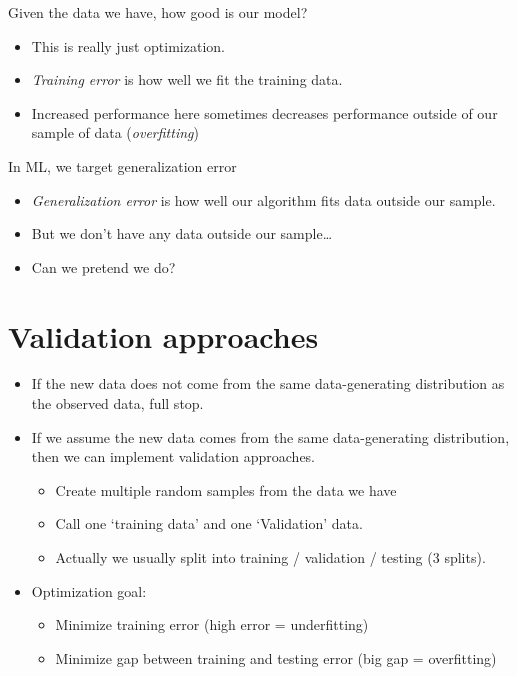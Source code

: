 \documentclass[fontset=fandol,zihao=false,scheme=chinese,heading=true,UTF8]{ctexbook}
\providecommand{\tightlist}{%
  \setlength{\itemsep}{0pt}\setlength{\parskip}{0pt}}
\begin{document}
Given the data we have, how good is our model?

\begin{itemize}
\tightlist
\item
  This is really just optimization.
\item
  \emph{Training error} is how well we fit the training data.
\item
  Increased performance here sometimes decreases performance outside of our sample of data (\emph{overfitting})
\end{itemize}

In ML, we target generalization error

\begin{itemize}
\tightlist
\item
  \emph{Generalization error} is how well our algorithm fits data outside our sample.
\item
  But we don't have any data outside our sample\ldots{}
\item
  Can we pretend we do?
\end{itemize}

\hypertarget{validation-approaches}{%
\section{Validation approaches}\label{validation-approaches}}

\begin{itemize}
\tightlist
\item
  If the new data does not come from the same data-generating distribution as the observed data, full stop.
\item
  If we assume the new data comes from the same data-generating distribution, then we can implement validation approaches.

  \begin{itemize}
  \tightlist
  \item
    Create multiple random samples from the data we have
  \item
    Call one `training data' and one `Validation' data.
  \item
    Actually we usually split into training / validation / testing (3 splits).
  \end{itemize}
\item
  Optimization goal:

  \begin{itemize}
  \tightlist
  \item
    Minimize training error (high error = underfitting)
  \item
    Minimize gap between training and testing error (big gap = overfitting)
  \end{itemize}
\end{itemize}
\end{document}
